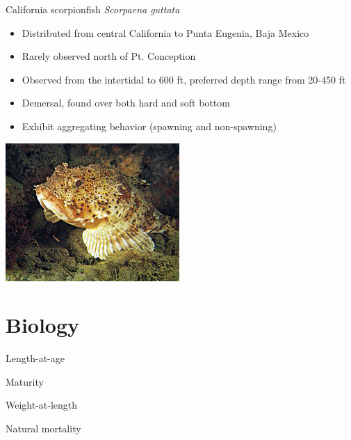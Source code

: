 \documentclass[ignorenonframetext,]{beamer}
\providecommand{\tightlist}{%
\setlength{\itemsep}{0pt}\setlength{\parskip}{0pt}}
\begin{document}
\begin{frame}{California scorpionfish \emph{Scorpaena guttata}}

\begin{itemize}
\tightlist
\item
  Distributed from central California to Punta Eugenia, Baja Mexico
\item
  Rarely observed north of Pt. Conception
\item
  Observed from the intertidal to 600 ft, preferred depth range from
  20-450 ft
\item
  Demersal, found over both hard and soft bottom
\item
  Exhibit aggregating behavior (spawning and non-spawning)
\end{itemize}

\includegraphics[width=.5\textwidth, right]{cover_photo}

\end{frame}

\section{Biology}\label{biology}

\begin{frame}{Length-at-age}

\end{frame}

\begin{frame}{Maturity}

\end{frame}

\begin{frame}{Weight-at-length}

\end{frame}

\begin{frame}{Natural mortality}

\end{frame}
\end{document}
